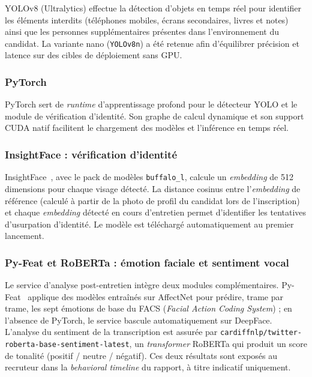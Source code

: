 YOLOv8 (Ultralytics) effectue la détection d'objets en temps réel pour identifier les éléments interdits (téléphones mobiles, écrans secondaires, livres et notes) ainsi que les personnes supplémentaires présentes dans l'environnement du candidat. La variante nano (\texttt{YOLOv8n}) a été retenue afin d'équilibrer précision et latence sur des cibles de déploiement sans GPU.


\subsubsection{PyTorch}

PyTorch sert de \textit{runtime} d'apprentissage profond pour le détecteur YOLO et le module de vérification d'identité. Son graphe de calcul dynamique et son support CUDA natif facilitent le chargement des modèles et l'inférence en temps réel.


\subsubsection{InsightFace : vérification d'identité}

InsightFace~\cite{deng2019}, avec le pack de modèles \texttt{buffalo\_l}, calcule un \textit{embedding} de 512 dimensions pour chaque visage détecté. La distance cosinus entre l'\textit{embedding} de référence (calculé à partir de la photo de profil du candidat lors de l'inscription) et chaque \textit{embedding} détecté en cours d'entretien permet d'identifier les tentatives d'usurpation d'identité. Le modèle est téléchargé automatiquement au premier lancement.


\subsubsection{Py-Feat et RoBERTa : émotion faciale et sentiment vocal}

Le service d'analyse post-entretien intègre deux modules complémentaires. Py-Feat~\cite{jolly2022} applique des modèles entraînés sur AffectNet pour prédire, trame par trame, les sept émotions de base du FACS (\textit{Facial Action Coding System}) ; en l'absence de PyTorch, le service bascule automatiquement sur DeepFace. L'analyse du sentiment de la transcription est assurée par \texttt{cardiffnlp/\allowbreak twitter-roberta-base-\allowbreak sentiment-latest}, un \textit{transformer} RoBERTa qui produit un score de tonalité (positif / neutre / négatif). Ces deux résultats sont exposés au recruteur dans la \textit{behavioral timeline} du rapport, à titre indicatif uniquement.

